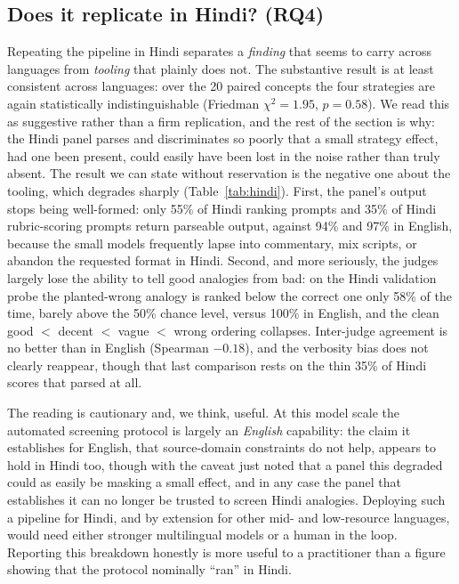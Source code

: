 \documentclass[11pt]{article}
\begin{document}
\subsection{Does it replicate in Hindi? (RQ4)}
\label{sec:results:rq4}
Repeating the pipeline in Hindi separates a \emph{finding} that seems to carry across languages
from \emph{tooling} that plainly does not. The substantive result is at least consistent across
languages: over the 20 paired concepts the four strategies are again statistically
indistinguishable (Friedman $\chi^2 = 1.95$, $p = 0.58$). We read this as suggestive rather than a
firm replication, and the rest of the section is why: the Hindi panel parses and discriminates so
poorly that a small strategy effect, had one been present, could easily have been lost in the noise
rather than truly absent. The result we can state without reservation is the negative one about the
tooling, which degrades sharply (Table~\ref{tab:hindi}). First, the panel's output
stops being well-formed: only 55\% of Hindi ranking prompts and 35\% of Hindi rubric-scoring prompts
return parseable output, against 94\% and 97\% in English, because the small models frequently lapse
into commentary, mix scripts, or abandon the requested format in Hindi. Second, and more seriously,
the judges largely lose the ability to tell good analogies from bad: on the Hindi validation probe
the planted-wrong analogy is ranked below the correct one only 58\% of the time, barely above the
50\% chance level, versus 100\% in English, and the clean good $<$ decent $<$ vague $<$ wrong
ordering collapses. Inter-judge agreement is no better than in English (Spearman $-0.18$), and the
verbosity bias does not clearly reappear, though that last comparison rests on the thin 35\% of
Hindi scores that parsed at all.

The reading is cautionary and, we think, useful. At this model scale the automated screening
protocol is largely an \emph{English} capability: the claim it establishes for English, that
source-domain constraints do not help, appears to hold in Hindi too, though with the caveat just
noted that a panel this degraded could as easily be masking a small effect, and in any case the
panel that establishes it can no longer be trusted to screen Hindi analogies. Deploying such a pipeline for Hindi, and by extension
for other mid- and low-resource languages, would need either stronger multilingual models or a human
in the loop. Reporting this breakdown honestly is more useful to a practitioner than a figure showing
that the protocol nominally ``ran'' in Hindi.
\end{document}
